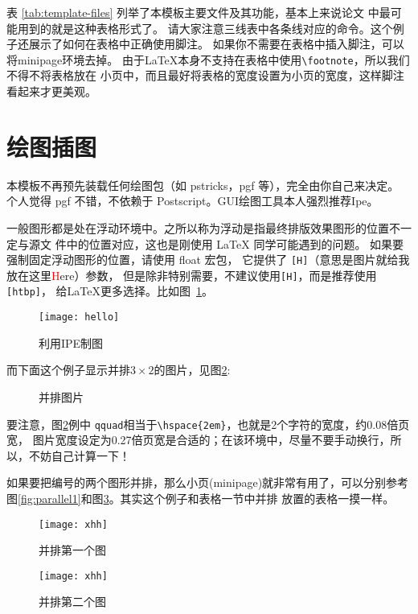 表 \ref{tab:template-files} 列举了本模板主要文件及其功能，基本上来说论文
中最可能用到的就是这种表格形式了。
请大家注意三线表中各条线对应的命令。这个例子还展示了如何在表格中正确使用脚注。
如果你不需要在表格中插入脚注，可以将minipage环境去掉。
由于\LaTeX{}本身不支持在表格中使用\verb|\footnote|，所以我们不得不将表格放在
小页中，而且最好将表格的宽度设置为小页的宽度，这样脚注看起来才更美观。

\section{绘图插图}

本模板不再预先装载任何绘图包（如 \textsf{pstricks，pgf} 等），完全由你自己来决定。
个人觉得 \textsf{pgf} 不错，不依赖于 Postscript。GUI绘图工具本人强烈推荐\textsf{Ipe}。

一般图形都是处在浮动环境中。之所以称为浮动是指最终排版效果图形的位置不一定与源文
件中的位置对应，这也是刚使用 \LaTeX{} 同学可能遇到的问题。
如果要强制固定浮动图形的位置，请使用 \textsf{float} 宏包，
它提供了 \texttt{[H]}（意思是图片就给我放在这里\textcolor{red}{H}ere）参数，
但是除非特别需要，不建议使用\texttt{[H]}，而是推荐使用\texttt{[htbp]}，
给\LaTeX{}更多选择。比如图~\ref{fig:ipe}。
\begin{figure}[htbp] %
  \centering
  \texttt{[image: hello]}
  \caption{利用IPE制图}
  \label{fig:ipe}
\end{figure}

而下面这个例子显示并排$3\times2$的图片，见图\ref{fig:subfig:3x2}:
\begin{figure}[htb]
\centering
{} \qquad
{} \qquad
{} \qquad
{} \qquad
{} \qquad
{}
\caption{并排图片}
\label{fig:subfig:3x2}
\end{figure}

要注意，图\ref{fig:subfig:3x2}例中
\texttt{qquad}相当于\verb|\hspace{2em}|，也就是2个字符的宽度，约0.08倍页宽，
图片宽度设定为0.27倍页宽是合适的；在该环境中，尽量不要手动换行，所以，不妨自己计算一下！

如果要把编号的两个图形并排，那么小页(minipage)就非常有用了，可以分别参考
图\ref{fig:parallel1}和图\ref{fig:parallel2}。其实这个例子和表格一节中并排
放置的表格一摸一样。
\begin{figure}[htb]
\begin{minipage}{0.48\textwidth}
  \centering
  \texttt{[image: xhh]}
  \caption{并排第一个图}
  \label{fig:parallel1}
\end{minipage}\hfill
\begin{minipage}{0.48\textwidth}
  \centering
  \texttt{[image: xhh]}
  \caption{并排第二个图}
  \label{fig:parallel2}
\end{minipage}
\end{figure}

